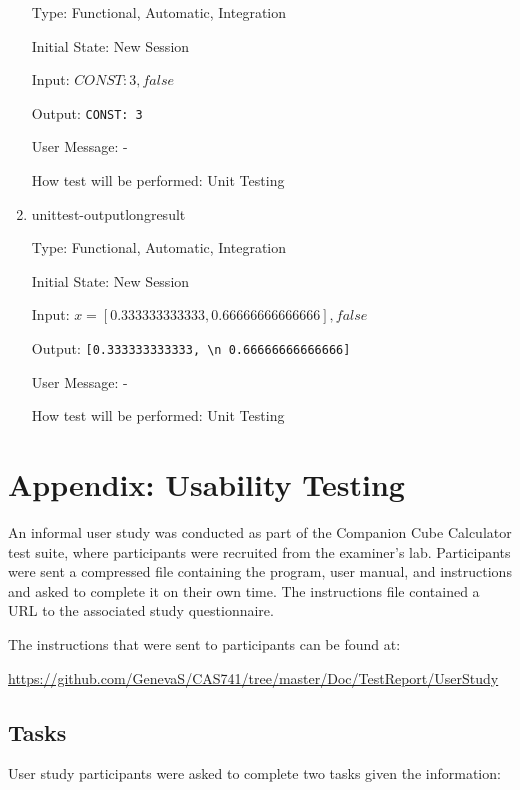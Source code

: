 \documentclass[12pt, titlepage]{article}
\newcommand{\progname}{Companion Cube Calculator} %
\begin{document}
\begin{enumerate}
	Type: Functional, Automatic, Integration
	
	Initial State: New Session
	
	Input: $CONST: 3, false$
	
	Output: \texttt{CONST: 3}
	
	User Message: - 
	
	How test will be performed: Unit Testing\\
	
	\item{unittest-outputlongresult}
	
	Type: Functional, Automatic, Integration
	
	Initial State: New Session
	
	Input: $x = [0.333333333333, 0.66666666666666], false$
	
	Output: \texttt{[0.333333333333, \textbackslash n 0.66666666666666]}
	
	User Message: - 
	
	How test will be performed: Unit Testing\\
	
\end{enumerate}

%

%

\newpage

\section{Appendix: Usability Testing}
\label{appendix_userstudy}
An informal user study was conducted as part of the \progname{} test suite, 
where participants were recruited from the examiner's lab. Participants were 
sent a compressed file containing the program, user manual, and instructions 
and asked to complete it on their own time. The instructions file contained a 
URL to the associated study questionnaire. 

The instructions that were sent to participants can be found at: 

\begin{center}
	\href{https://github.com/GenevaS/CAS741/tree/master/Doc/TestReport/UserStudy}{https://github.com/GenevaS/CAS741/tree/master/Doc/TestReport/UserStudy}
\end{center}

\subsection{Tasks}
User study participants were asked to complete two tasks given the information: 
\end{document}
